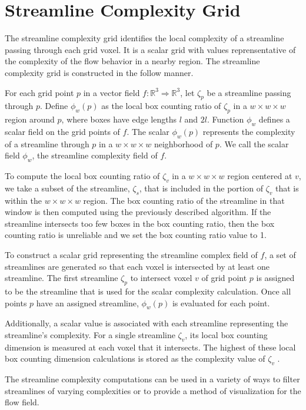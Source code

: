 \documentclass{egpubl}
\newcommand {\emath}[1]  {\ensuremath{#1}}
\newcommand {\Real}[1]   {\emath{\mathbb{R}^{#1}}}   %
\newcommand {\Rthree}    {\Real{3}}                  %
\newcommand {\gDim}[1]   {\emath{#1 \times #1 \times #1}} %
\begin{document}
\section{Streamline Complexity Grid} \label{sec:scg}

The streamline complexity grid identifies the local complexity of a streamline passing through each grid voxel.
It is a scalar grid with values reprensentative of the complexity of the flow behavior in a nearby region.
The streamline complexity grid is constructed in the follow manner.

For each grid point $p$ in a vector field $f: \Rthree \Rightarrow \Rthree$,
let $\zeta_p$ be a streamline passing through $p$.
Define $\phi_w(p)$ as the local box counting ratio of $\zeta_p$
in a $\gDim{w}$ region around $p$,
where boxes have edge lengths $l$ and $2l$.
Function $\phi_w$ defines a scalar field on the grid points of $f$.
The scalar $\phi_w(p)$ represents the complexity of a streamline through $p$ in a $\gDim{w}$ neighborhood of $p$.
We call the scalar field $\phi_w$, the streamline complexity field of $f$.

To compute the local box counting ratio of $\zeta_v$ in a $\gDim{w}$ region centered at $v$, we take a subset of the streamline, $\zeta_s$, that is included in the portion of $\zeta_v$ that is within the $\gDim{w}$ region.
The box counting ratio of the streamline in that window is then computed using the previously described algorithm.
If the streamline intersects too few boxes in the box counting ratio, then the box counting ratio is unreliable and we set the box counting ratio value to 1.

To construct a scalar grid representing the streamline complex field of $f$, a set of streamlines are generated so that each voxel is intersected by at least one streamline.
The first streamline $\zeta_p$ to intersect voxel $v$ of grid point $p$ is assigned to be the streamline that is used for the scalar complexity calculation.
Once all points $p$ have an assigned streamline, $\phi_w(p)$ is evaluated for each point.

Additionally, a scalar value is associated with each streamline representing the streamline's complexity.
For a single streamline $\zeta_v$, its local box counting dimension is measured at each voxel that it intersects.
The highest of these local box counting dimension calculations is stored as the complexity value of $\zeta_v$ .

The streamline complexity computations can be used in a variety of ways to filter streamlines of varying complexities or to provide a method of visualization for the flow field.
\end{document}
